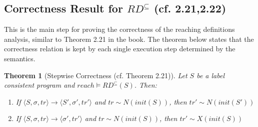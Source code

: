 \documentclass[a4wide,12pt]{article}
\theoremstyle{definition}
\theoremstyle{plain}
\newtheorem{theo}{Theorem}
\theoremstyle{remark}
\def\const#1{\mathopen{\langle}#1\mathclose{\rangle}} %
\def\pair#1{\const{#1}}
\begin{document}
\subsection*{Correctness Result for $RD^\subseteq$ (cf. 2.21,2.22)}

This is the main step for proving the correctness
of the reaching definitions analysis, similar to Theorem 2.21 in the book.
The theorem below states that the correctness
relation is kept by each single execution step
determined by the semantics.

\begin{theo}[Stepwise Correctness (cf. Theorem 2.21)]
\label{theo221}
Let $S$ be a label consistent program and $reach \models RD^{\subseteq}(S)$. Then:
\begin{enumerate}
\item If $\pair{S,\sigma, tr} \to \pair{S', \sigma', tr'}$ and $tr \sim N(init(S))$, then $tr' \sim N(init(S'))$
\item If $\pair{S,\sigma, tr} \to \pair{\sigma', tr'}$ and $tr \sim N(init(S))$, then $tr' \sim X(init(S))$
\end{enumerate}
\end{theo}
\end{document}
